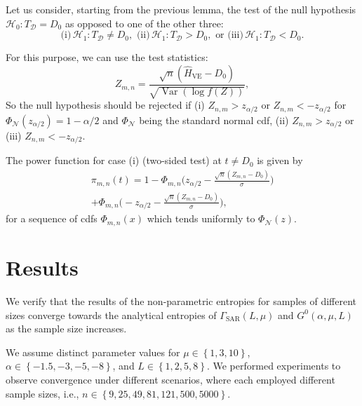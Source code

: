 \documentclass[conference]{IEEEtran}
\begin{document}
{Let us consider, starting from the previous lemma, the test of the null hypothesis $\mathcal{H}_0: T_{\mathcal{D}}=D_0$ as opposed to one of the other three:
$$
\text{(i)}\, \mathcal{H}_1:T_{\mathcal{D}}\neq D_0, \, \, \text{(ii)}\, \mathcal{H}_1:T_{\mathcal{D}}> D_0, \, \, \text{or}\, \,  \text{(iii)}\, \mathcal{H}_1:T_{\mathcal{D}}< D_0. 
$$


For this purpose, we can use the test statistics:
$$
Z_{m,n} = \frac{\sqrt{n}(\widehat{H}_{\text{VE}}-D_0)}{\sqrt{\operatorname{Var}(\log f(Z))}},
$$
So the null hypothesis should be rejected if (i) $Z_{n,m} > z_{\alpha/2}$ or $Z_{n,m} < - z_{\alpha/2}$ for $\Phi_{\mathcal N}(z_{\alpha/2})=1-\alpha/2$ and $\Phi_{\mathcal N}$ being the standard normal cdf, (ii) $Z_{n,m} > z_{\alpha/2}$ or (iii) $Z_{n,m} < - z_{\alpha/2}$.  

The power function for case (i) (two-sided test) at $t\neq D_0$ is given by
\begin{multline*}
\pi_{m,n}(t)=1-\Phi_{m,n}\Big(z_{\alpha/2}-\frac{\sqrt{n}(Z_{m,n}-D_0)}{\sigma}\Big)\\+\Phi_{m,n}\Big(-z_{\alpha/2}-\frac{\sqrt{n}(Z_{m,n}-D_0)}{\sigma}\Big),
\end{multline*}
for a sequence of cdfs $\Phi_{m,n}(x)$ which tends uniformly to $\Phi_{\mathcal N}(z)$.

\section{Results}

We verify that the results of the non-parametric entropies for samples of different sizes converge towards the analytical entropies of $\Gamma_{\text{SAR}}(L, \mu)$ and $G^0(\alpha, \mu , L)$ as the sample size increases. 

We assume distinct parameter values for $\mu \in \left\{1, 3, 10\right\}$,  $\alpha\in\left\{-1.5,-3,-5, -8\right\}$, and  $L \in\left\{1,2, 5, 8\right\}$.
We performed experiments to observe convergence under different scenarios, where each employed different sample sizes, i.e., $n\in \left\{9, 25, 49, 81, 121, 500, 5000\right\}$. 

}
\end{document}
